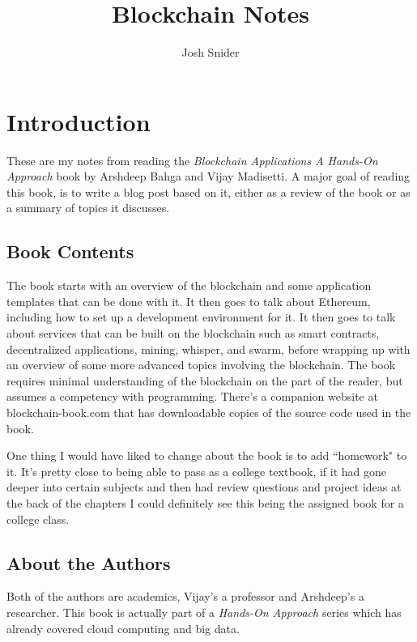\documentclass{article}
\begin{document}
\title{Blockchain Notes}
\author{Josh Snider}

\maketitle


\section{Introduction}
These are my notes from reading the \textit{Blockchain Applications A Hands-On Approach} book by Arshdeep Bahga and Vijay Madisetti. A major goal of reading this book, is to write a blog post based on it, either as a review of the book or as a summary of topics it discusses.

\subsection{Book Contents}
The book starts with an overview of the blockchain and some application templates that can be done with it. It then goes to talk about Ethereum, including how to set up a development environment for it. It then goes to talk about services that can be built on the blockchain such as smart contracts, decentralized applications, mining, whisper, and swarm, before wrapping up with an overview of some more advanced topics involving the blockchain. The book requires minimal understanding of the blockchain on the part of the reader, but assumes a competency with programming. There's a companion website at blockchain-book.com that has downloadable copies of the source code used in the book.

One thing I would have liked to change about the book is to add ``homework" to it. It's
pretty close to being able to pass as a college textbook, if it had gone deeper into certain subjects and then had review questions and
project ideas at the back of the chapters I could definitely see this being the assigned book for a college class.

\subsection{About the Authors}

Both of the authors are academics, Vijay's a professor and Arshdeep's a researcher. This book is actually part of a \textit{Hands-On Approach} series which has already covered cloud computing and big data.
\end{document}
